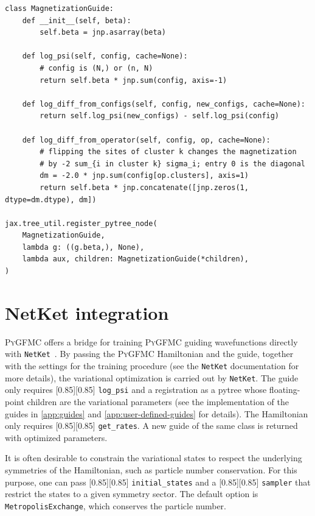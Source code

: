 \documentclass{SciPost}
\newcommand{\pyinline}[1]{\begingroup\setlength{\fboxsep}{0pt}%
  \colorbox{gray!15}{\raisebox{0pt}[0.85\ht\strutbox][0.85\dp\strutbox]{%
    \hspace{1pt}\lstinline{#1}\hspace{1pt}}}\endgroup}
\providecommand{\PyGFMC}{\textsc{PyGFMC}}
\begin{document}
\begin{lstlisting}
class MagnetizationGuide:
    def __init__(self, beta):
        self.beta = jnp.asarray(beta)

    def log_psi(self, config, cache=None):
        # config is (N,) or (n, N)
        return self.beta * jnp.sum(config, axis=-1)

    def log_diff_from_configs(self, config, new_configs, cache=None):
        return self.log_psi(new_configs) - self.log_psi(config)

    def log_diff_from_operator(self, config, op, cache=None):
        # flipping the sites of cluster k changes the magnetization
        # by -2 sum_{i in cluster k} sigma_i; entry 0 is the diagonal
        dm = -2.0 * jnp.sum(config[op.clusters], axis=1)
        return self.beta * jnp.concatenate([jnp.zeros(1, dtype=dm.dtype), dm])

jax.tree_util.register_pytree_node(
    MagnetizationGuide,
    lambda g: ((g.beta,), None),
    lambda aux, children: MagnetizationGuide(*children),
)
\end{lstlisting}




\section{NetKet integration}\label{app:netket}
\PyGFMC{} offers a bridge for training \PyGFMC{} guiding wavefunctions directly with \texttt{NetKet}~\cite{SciPostPhysCodeb.7,SciPostPhysCodeb.7-r3.4}.
%
By passing the \PyGFMC{} Hamiltonian and the guide, together with the settings for the training procedure (see the \texttt{NetKet} documentation for more details), the variational optimization is carried out by \texttt{NetKet}.
%
The guide only requires \pyinline{log_psi} and a registration as a pytree whose floating-point children are the variational parameters (see the implementation of the guides in \autoref{app:guides} and \autoref{app:user-defined-guides} for details).
%
The Hamiltonian only requires \pyinline{get_rates}.
%
A new guide of the same class is returned with optimized parameters.

It is often desirable to constrain the variational states to respect the underlying symmetries of the Hamiltonian, such as particle number conservation.
%
For this purpose, one can pass \pyinline{initial_states} and a \pyinline{sampler} that restrict the states to a given symmetry sector.
%
The default option is \texttt{MetropolisExchange}, which conserves the particle number.\\
\end{document}
